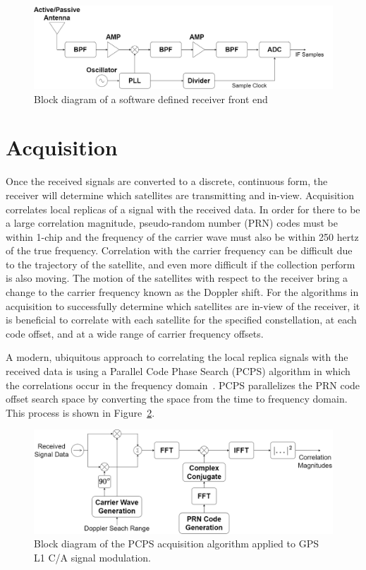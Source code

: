 \begin{figure}[!ht]\label{fig:frontend}
    \centering
    \includegraphics[width=\linewidth]{Figures/frontend.drawio.png}
    \caption{Block diagram of a software defined receiver front end}
\end{figure}

\section{Acquisition}
Once the received signals are converted to a discrete, continuous form, the receiver will determine which satellites are transmitting and in-view. Acquisition correlates local replicas of a signal with the received data. In order for there to be a large correlation magnitude, pseudo-random number (PRN) codes must be within 1-chip and the frequency of the carrier wave must also be within 250 hertz of the true frequency. Correlation with the carrier frequency can be difficult due to the trajectory of the satellite, and even more difficult if the collection perform is also moving. The motion of the satellites with respect to the receiver bring a change to the carrier frequency known as the Doppler shift. For the algorithms in acquisition to successfully determine which satellites are in-view of the receiver, it is beneficial to correlate with each satellite for the specified constellation, at each code offset, and at a wide range of carrier frequency offsets.

A modern, ubiquitous approach to correlating the local replica signals with the received data is using a Parallel Code Phase Search (PCPS) algorithm in which the correlations occur in the frequency domain~\cite{scottRapidSignalAcquisition}. PCPS parallelizes the PRN code offset search space by converting the space from the time to frequency domain. This process is shown in Figure~\ref{fig:PCPS}.

\begin{figure}[!ht]\label{fig:PCPS}
    \centering
    \includegraphics[width=\linewidth]{Figures/PCPS.drawio.png}
    \caption{Block diagram of the PCPS acquisition algorithm applied to GPS L1 C/A signal modulation.}
\end{figure}

